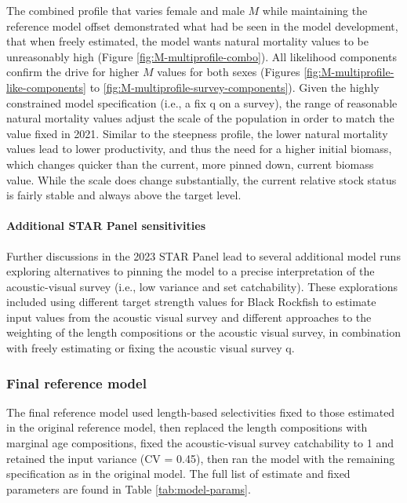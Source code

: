 \documentclass[11pt,
  english,
  letterpaper,
]{article}
\begin{document}
The combined profile that varies female and male \(M\) while maintaining the reference model offset demonstrated what had be seen in the model development, that when freely estimated, the model wants natural mortality values to be unreasonably high (Figure \ref{fig:M-multiprofile-combo}). All likelihood components confirm the drive for higher \(M\) values for both sexes (Figures \ref{fig:M-multiprofile-like-components} to \ref{fig:M-multiprofile-survey-components}). Given the highly constrained model specification (i.e., a fix q on a survey), the range of reasonable natural mortality values adjust the scale of the population in order to match the value fixed in 2021. Similar to the steepness profile, the lower natural mortality values lead to lower productivity, and thus the need for a higher initial biomass, which changes quicker than the current, more pinned down, current biomass value. While the scale does change substantially, the current relative stock status is fairly stable and always above the target level.

\hypertarget{additional-star-panel-sensitivities}{%
\paragraph{Additional STAR Panel sensitivities}\label{additional-star-panel-sensitivities}}

Further discussions in the 2023 STAR Panel lead to several additional model runs exploring alternatives to pinning the model to a precise interpretation of the acoustic-visual survey (i.e., low variance and set catchability). These explorations included using different target strength values for Black Rockfish to estimate input values from the acoustic visual survey and different approaches to the weighting of the length compositions or the acoustic visual survey, in combination with freely estimating or fixing the acoustic visual survey q.

\hypertarget{final-reference-model}{%
\subsubsection{Final reference model}\label{final-reference-model}}

The final reference model used length-based selectivities fixed to those estimated in the original reference model, then replaced the length compositions with marginal age compositions, fixed the acoustic-visual survey catchability to 1 and retained the input variance (CV = 0.45), then ran the model with the remaining specification as in the original model. The full list of estimate and fixed parameters are found in Table \ref{tab:model-params}.
\end{document}
